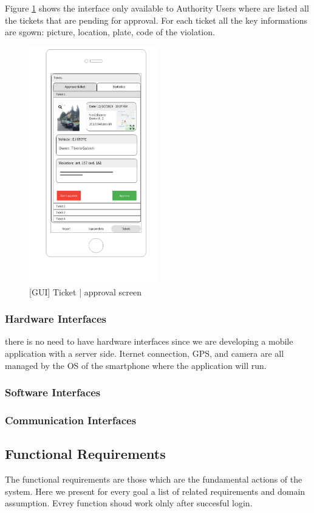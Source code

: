 Figure \ref{fig:ticket} shows the interface only available to Authority Users where are listed all the tickets that are pending for approval. For each ticket all the key informations are sgown: picture, location, plate, code of the violation.
\begin{figure}[H]
		\centering
      \includegraphics[width=0.5\textwidth]{GUI/ticketapp.png}
      \caption{[GUI] Ticket | approval screen}   \label{fig:ticket}
\end{figure}

\subsubsection{Hardware Interfaces}
there is no need to have hardware interfaces since we are developing a mobile application with a server side.
Iternet connection, GPS, and camera are all managed by the OS of the smartphone where the application will run.
\subsubsection{Software Interfaces}

\subsubsection{Communication Interfaces}


\subsection{Functional  Requirements}
The functional requirements are those which are the fundamental actions of the system. Here we present for every goal a list  of related requirements and domain assumption.
Evrey function shoud work olnly after succesful login.


